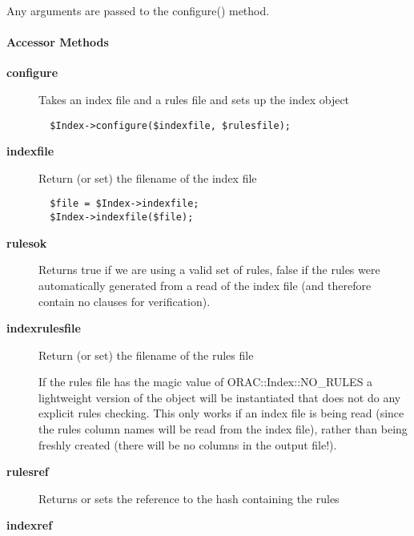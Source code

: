 \begin{description}
\begin{description}
\begin{description}
Any arguments are passed to the configure() method.

\end{description}
\paragraph*{Accessor Methods\label{ORAC::Index_Accessor_Methods}}
\begin{description}

\item[{\textbf{configure}}] \mbox{}

Takes an index file and a rules file and sets up the index object

\begin{verbatim}
  $Index->configure($indexfile, $rulesfile);
\end{verbatim}

\item[{\textbf{indexfile}}] \mbox{}

Return (or set) the filename of the index file

\begin{verbatim}
  $file = $Index->indexfile;
  $Index->indexfile($file);
\end{verbatim}

\item[{\textbf{rulesok}}] \mbox{}

Returns true if we are using a valid set of rules, false
if the rules were automatically generated from a read of the
index file (and therefore contain no clauses for verification).


\item[{\textbf{indexrulesfile}}] \mbox{}

Return (or set) the filename of the rules file



If the rules file has the magic value of ORAC::Index::NO\_RULES a lightweight
version of the object will be instantiated that does not do any
explicit rules checking. This only works if an index file is being
read (since the rules column names will be read from the index file),
rather than being freshly created (there will be no columns in the
output file!).


\item[{\textbf{rulesref}}] \mbox{}

Returns or sets the reference to the hash containing the rules


\item[{\textbf{indexref}}] \mbox{}


\end{description}
\end{description}
\end{description}
